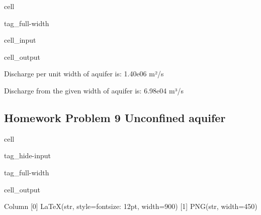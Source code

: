 \documentclass[letterpaper,10pt,english]{jupyterBook}
\begin{document}
\begin{sphinxuseclass}{cell}
\begin{sphinxuseclass}{tag_full-width}
\begin{sphinxVerbatimInput}
\begin{sphinxuseclass}{cell_input}
\end{sphinxuseclass}\end{sphinxVerbatimInput}
\begin{sphinxVerbatimOutput}

\begin{sphinxuseclass}{cell_output}
\begin{sphinxVerbatim}[commandchars=\\\{\}]
Discharge per unit width of aquifer is: 1.40e\PYGZhy{}06 m²/s 

Discharge from the given width of aquifer is: 6.98e\PYGZhy{}04 m³/s
\end{sphinxVerbatim}

\end{sphinxuseclass}\end{sphinxVerbatimOutput}

\end{sphinxuseclass}
\end{sphinxuseclass}

\subsection{Homework Problem 9 \sphinxhyphen{} Unconfined aquifer}
\label{\detokenize{content/tutorials/T8/tutorial_08:homework-problem-9-unconfined-aquifer}}
\begin{sphinxuseclass}{cell}
\begin{sphinxuseclass}{tag_hide-input}
\begin{sphinxuseclass}{tag_full-width}\begin{sphinxVerbatimOutput}

\begin{sphinxuseclass}{cell_output}
\begin{sphinxVerbatim}[commandchars=\\\{\}]
Column
    [0] LaTeX(str, style=\PYGZob{}\PYGZsq{}font\PYGZhy{}size\PYGZsq{}: \PYGZsq{}12pt\PYGZsq{}\PYGZcb{}, width=900)
    [1] PNG(str, width=450)
\end{sphinxVerbatim}

\end{sphinxuseclass}\end{sphinxVerbatimOutput}

\end{sphinxuseclass}
\end{sphinxuseclass}
\end{sphinxuseclass}
\end{document}

